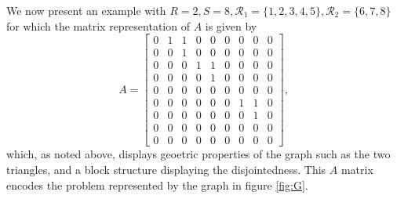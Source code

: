\documentclass[10pt]{article}
\theoremstyle{definition}
\theoremstyle{plain}
\theoremstyle{remark}
\begin{document}
	We now present an example with $R=2, S=8, \mathcal{R}_1=\{1,2,3,4,5\}, \mathcal{R}_2=\{6,7,8\}$ for which the matrix representation of $A$ is given by
	\begin{equation}
		A = \begin{bmatrix}
			0 & 1 & 1 & 0 & 0 & 0 & 0 & 0 & 0 \\
			0 & 0 & 1 & 0 & 0 & 0 & 0 & 0 & 0 \\
			0 & 0 & 0 & 1 & 1 & 0 & 0 & 0 & 0 \\
			0 & 0 & 0 & 0 & 1 & 0 & 0 & 0 & 0 \\
			0 & 0 & 0 & 0 & 0 & 0 & 0 & 0 & 0 \\
			0 & 0 & 0 & 0 & 0 & 0 & 1 & 1 & 0 \\
			0 & 0 & 0 & 0 & 0 & 0 & 0 & 1 & 0 \\
			0 & 0 & 0 & 0 & 0 & 0 & 0 & 0 & 0 \\
			0 & 0 & 0 & 0 & 0 & 0 & 0 & 0 & 0 
		\end{bmatrix},
	\end{equation}
	which, as noted above, displays geoetric properties of the graph such as the two triangles, and a block structure displaying the disjointedness. This $A$ matrix encodes the problem represented by the graph in figure \ref{fig:G}.
\end{document}
